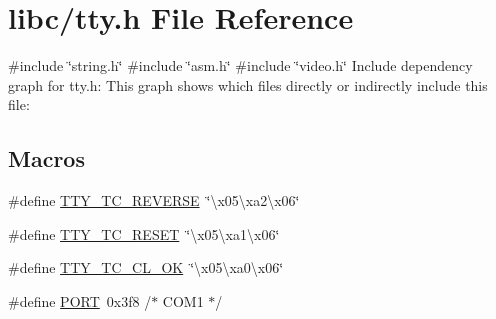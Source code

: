 \hypertarget{a00035}{}\section{libc/tty.h File Reference}
\label{a00035}
{\ttfamily \#include \char`\"{}string.\+h\char`\"{}}\newline
{\ttfamily \#include \char`\"{}asm.\+h\char`\"{}}\newline
{\ttfamily \#include \char`\"{}video.\+h\char`\"{}}\newline
Include dependency graph for tty.\+h\+:
This graph shows which files directly or indirectly include this file\+:
\subsection*{Macros}
\begin{DoxyCompactItemize}
\item 
\#define \hyperlink{a00035_a3444f7a6be040f896a3e9fd54492ea30_a3444f7a6be040f896a3e9fd54492ea30}{T\+T\+Y\+\_\+\+T\+C\+\_\+\+R\+E\+V\+E\+R\+SE}~\char`\"{}\textbackslash{}x05\textbackslash{}xa2\textbackslash{}x06\char`\"{}
\item 
\#define \hyperlink{a00035_ab24b4c1e8b7584524496f5f12ba74038_ab24b4c1e8b7584524496f5f12ba74038}{T\+T\+Y\+\_\+\+T\+C\+\_\+\+R\+E\+S\+ET}~\char`\"{}\textbackslash{}x05\textbackslash{}xa1\textbackslash{}x06\char`\"{}
\item 
\#define \hyperlink{a00035_adb3a26d3e17785ad896a61607f77a7dd_adb3a26d3e17785ad896a61607f77a7dd}{T\+T\+Y\+\_\+\+T\+C\+\_\+\+C\+L\+\_\+\+OK}~\char`\"{}\textbackslash{}x05\textbackslash{}xa0\textbackslash{}x06\char`\"{}
\item 
\#define \hyperlink{a00035_a614217d263be1fb1a5f76e2ff7be19a2_a614217d263be1fb1a5f76e2ff7be19a2}{P\+O\+RT}~0x3f8   /$\ast$ C\+O\+M1 $\ast$/
\end{DoxyCompactItemize}
